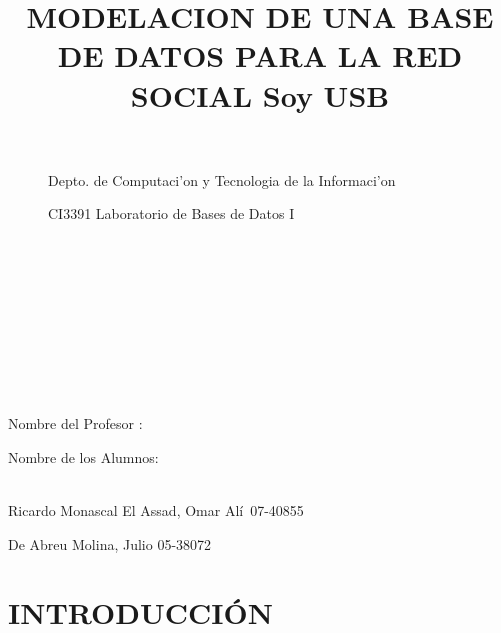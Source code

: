 \documentclass{article}
\begin{document}
\begin{figure}[h] 



Depto. de Computaci'on y Tecnologia de la Informaci'on\

CI3391 Laboratorio de Bases de Datos I\\\\\\\\\\\\\\\\\\\\

\title{\bf{MODELACION DE UNA BASE DE DATOS PARA LA RED SOCIAL Soy USB}}

  \maketitle
  
  
  
        
  
  
  
 

\end{figure}

  



  
\begin{bf} Nombre del Profesor :\end{bf}	\hspace{3cm}                    \begin{bf}  Nombre de los Alumnos: \end{bf}\\
     Ricardo Monascal      \hspace{5cm}                   El Assad, Omar Al\'i\ 07-40855\\  
                                                                                \begin{flushright} De Abreu Molina, Julio 05-38072  \end{flushright}
       
   

  
  \newpage
  \tableofcontents
  
  
  \newpage
  
  \section{INTRODUCCI\'ON}
  
\end{document}
